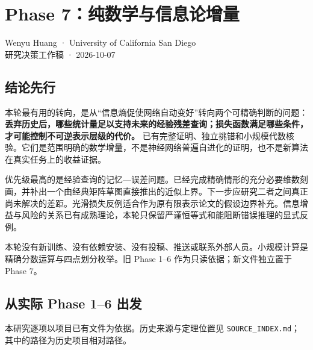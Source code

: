 \documentclass[11pt]{article}
\begin{document}
\section{Phase 7：纯数学与信息论增量}\label{phase-7ux7eafux6570ux5b66ux4e0eux4fe1ux606fux8bbaux589eux91cf}

Wenyu Huang · University of California San Diego\\
研究决策工作稿 · 2026-10-07

\subsection{结论先行}\label{ux7ed3ux8bbaux5148ux884c}

本轮最有用的转向，是从``信息熵促使网络自动变好''转向两个可精确判断的问题：\textbf{丢弃历史后，哪些统计量足以支持未来的经验残差查询；损失函数满足哪些条件，才可能控制不可逆表示层级的代价。} 已有完整证明、独立挑错和小规模代数核验。它们是范围明确的数学增量，不是神经网络普遍自进化的证明，也不是新算法在真实任务上的收益证据。

优先级最高的是经验查询的记忆---误差问题。已经完成精确情形的充分必要维数刻画，并补出一个由经典矩阵草图直接推出的近似上界。下一步应研究二者之间真正尚未解决的差距。光滑损失反例适合作为原有限表示论文的假设边界补充。信息增益与风险的关系已有成熟理论，本轮只保留严谨恒等式和能阻断错误推理的显式反例。

本轮没有新训练、没有依赖安装、没有投稿、推送或联系外部人员。小规模计算是精确分数运算与四点划分枚举。旧 Phase 1--6 作为只读依据；新文件独立置于 Phase 7。

\subsection{从实际 Phase 1--6 出发}\label{ux4eceux5b9eux9645-phase-16-ux51faux53d1}

本研究逐项以项目已有文件为依据。历史来源与定理位置见 \nolinkurl{SOURCE_INDEX.md}；其中的路径为历史项目相对路径。
\end{document}
